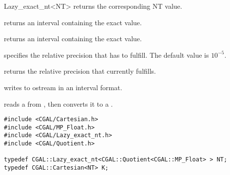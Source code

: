 \begin{ccRefClass} {Lazy_exact_nt<NT>}
 {returns the corresponding NT value.}

 {returns an interval containing the
exact value.}

 {returns an interval containing the 
exact value.}

{specifies the relative precision that  has to fulfill.
The default value is $10^{-5}$.  }

{returns the relative precision that  currently fulfills.}

{writes  to ostream  in an interval format.}

{reads a  from , then converts it to a .}

\ccExample

\begin{verbatim}
#include <CGAL/Cartesian.h>
#include <CGAL/MP_Float.h>
#include <CGAL/Lazy_exact_nt.h>
#include <CGAL/Quotient.h>

typedef CGAL::Lazy_exact_nt<CGAL::Quotient<CGAL::MP_Float> > NT;
typedef CGAL::Cartesian<NT> K;
\end{verbatim}

\end{ccRefClass} 

